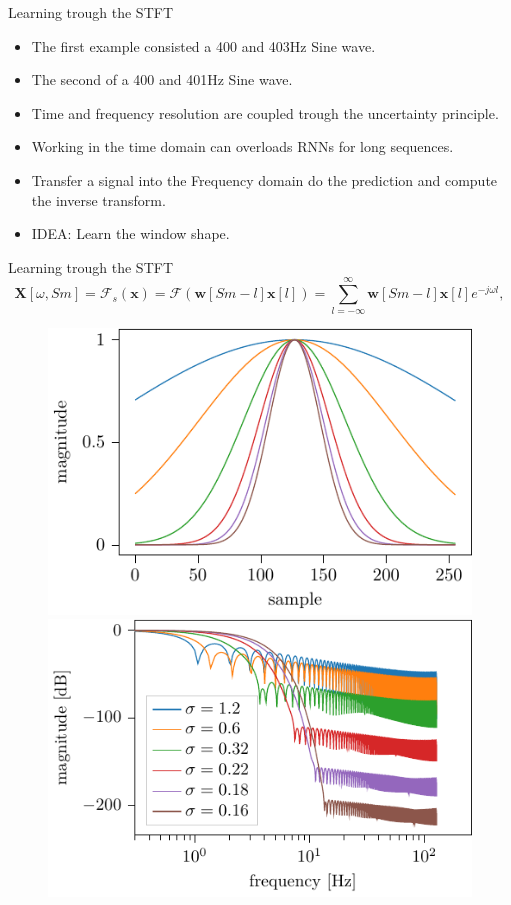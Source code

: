 \documentclass[xcolor=dvipsnames]{beamer}
\begin{document}
\begin{frame}{Learning trough the STFT}
\begin{itemize}
\item The first example consisted a 400 and 403Hz Sine wave.
\item The second of a 400 and 401Hz Sine wave.
\item Time and frequency resolution are coupled trough the uncertainty principle.
\item Working in the time domain can overloads RNNs for long sequences.
\item Transfer a signal into the Frequency domain do the prediction and compute the inverse transform.
\item IDEA: Learn the window shape.

\end{itemize}
\end{frame}

\begin{frame}{Learning trough the STFT}
\begin{equation}
    \mathbf{X} [\omega, Sm] 
    = \mathcal{F}_s\left(\mathbf{x}\right) = \mathcal{F}\left(\mathbf{w}[Sm - l]\mathbf{x}[l]\right) = \sum_{l = -\infty}^{\infty} \mathbf{w}[Sm - l]\mathbf{x}[l]e^{-j\omega l},
    \label{eq:STFT}
\end{equation}
\begin{figure}
    \centering
    \includegraphics[width=0.49\linewidth]{./img/gaussian_window_sigma_plot.pdf}
    \includegraphics[width=0.49\linewidth]{./img/gaussian_window_sigma_freq_plot.pdf}
\end{figure}
\end{frame}
\end{document}
